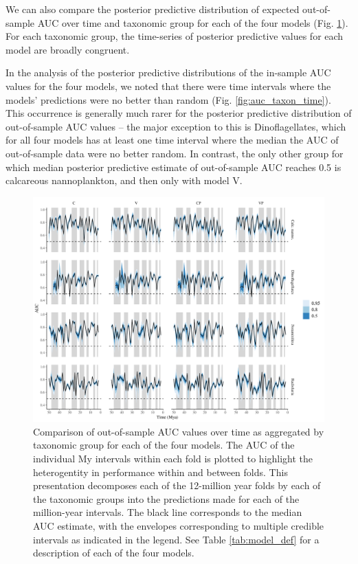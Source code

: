 \documentclass[12pt,letterpaper]{article}
\begin{document}
We can also compare the posterior predictive distribution of expected out-of-sample AUC over time and taxonomic group for each of the four models (Fig. \ref{fig:fold_auc_taxon_time}). For each taxonomic group, the time-series of posterior predictive values for each model are broadly congruent. 

In the analysis of the posterior predictive distributions of the in-sample AUC values for the four models, we noted that there were time intervals where the models' predictions were no better than random (Fig. \ref{fig:auc_taxon_time}). This occurrence is generally much rarer for the posterior predictive distribution of out-of-sample AUC values -- the major exception to this is Dinoflagellates, which for all four models has at least one time interval where the median the AUC of out-of-sample data were no better random. In contrast, the only other group for which median posterior predictive estimate of out-of-sample AUC reaches 0.5 is calcareous nannoplankton, and then only with model V.
\begin{figure}[ht]
  \centering
  \includegraphics[width=\textwidth,height=0.5\textheight,keepaspectratio=true]{../results/figure/fold_auc_taxon_time_full}
  \caption{Comparison of out-of-sample AUC values over time as aggregated by taxonomic group for each of the four models. The AUC of the individual My intervals within each fold is plotted to highlight the heterogentity in performance within and between folds. This presentation decomposes each of the 12-million year folds by each of the taxonomic groups into the predictions made for each of the million-year intervals. The black line corresponds to the median AUC estimate, with the envelopes corresponding to multiple credible intervals as indicated in the legend. See Table \ref{tab:model_def} for a description of each of the four models.}
  \label{fig:fold_auc_taxon_time}
\end{figure}
\end{document}
